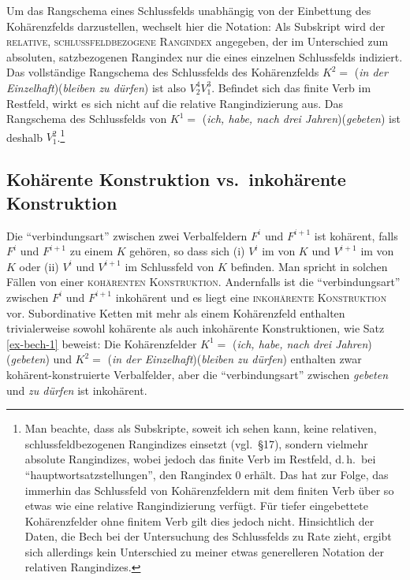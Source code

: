 Um das Rangschema eines Schlussfelds unabhängig von der Einbettung des Kohärenzfelds darzustellen, wechselt hier die Notation: Als Subskript wird der \textsc{relative, schlussfeldbezogene Rangindex} angegeben, der im Unterschied zum absoluten, satzbezogenen Rangindex nur die  eines einzelnen Schlussfelds indiziert. Das vollständige Rangschema des Schlussfelds des Kohärenzfelds $K^2 =$  ({\it in der Einzelhaft})({\it bleiben zu dürfen}) ist also $V^4_2 V^3_1$. Befindet sich das finite Verb im Restfeld, wirkt es sich nicht auf die relative Rangindizierung aus. Das Rangschema des Schlussfelds von $K^1 =$ ({\it ich, habe, nach drei Jahren})({\it gebeten}) ist deshalb $V^2_1$.\footnote{Man beachte, dass \cite{Bech:55} als Subskripte, soweit ich sehen kann, keine relativen, schlussfeldbezogenen Rangindizes einsetzt (vgl.\ \S 17), sondern vielmehr absolute Rangindizes, wobei jedoch das finite Verb im Restfeld, d.\,h.\ bei "`hauptwortsatzstellungen"', den Rangindex 0 erhält. Das hat zur Folge, das immerhin das Schlussfeld von Kohärenzfeldern mit dem finiten Verb über so etwas wie eine relative Rangindizierung verfügt. Für tiefer eingebettete Kohärenzfelder ohne finitem Verb gilt dies jedoch nicht. Hinsichtlich der Daten, die Bech bei der Untersuchung des Schlussfelds zu Rate zieht, ergibt sich allerdings kein Unterschied zu meiner etwas generelleren Notation der relativen Rangindizes.}     




\subsection{Kohärente Konstruktion vs.\ inkohärente Konstruktion}

Die "`verbindungsart"' \citep[\S 71]{Bech:55} zwischen zwei Verbalfeldern $F^i$ und $F^{i+1}$ ist kohärent, falls $F^i$ und $F^{i+1}$ zu einem  $K$ gehören, so dass sich (i) $V^i$ im  von $K$ und $V^{i+1}$ im  von $K$ oder (ii) $V^i$ und $V^{i+1}$ im Schlussfeld von $K$ befinden. Man spricht in solchen Fällen von einer \textsc{kohärenten Konstruktion}. Andernfalls ist die "`verbindungsart"' zwischen $F^i$ und $F^{i+1}$ inkohärent und es liegt eine \textsc{inkohärente Konstruktion} vor. Subordinative Ketten mit mehr als einem Kohärenzfeld enthalten trivialerweise sowohl kohärente als auch inkohärente Konstruktionen, wie Satz \ref{ex-bech-1} beweist: Die Kohärenzfelder $K^1 =$ ({\it ich, habe, nach drei Jahren})({\it gebeten}) und $K^2 =$  ({\it in der Einzelhaft})({\it bleiben zu dürfen}) enthalten zwar kohärent-konstruierte Verbalfelder, aber die "`verbindungsart"' zwischen {\it gebeten} und {\it zu dürfen} ist inkohärent.

